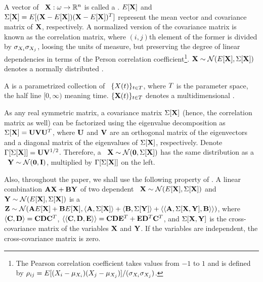 A vector of \rvs\ $\mathbf{X}: \omega \to \mathbb{R}^n$ is called a . $E[\mathbf{X}]$ and $\Sigma[\mathbf{X}] = E[(\mathbf{X} - E[\mathbf{X}])(\mathbf{X} - E[\mathbf{X}])^T]$ represent the mean vector and covariance matrix of $\mathbf{X}$, respectively. A normalized version of the covariance matrix is known as the correlation matrix, where $(i,j)$th element of the former is divided by $\sigma_{X_i} \sigma_{X_j}$, loosing the units of measure, but preserving the degree of linear dependencies in terms of the Person correlation coefficient\footnote{The Pearson correlation coefficient takes values from $-1$ to $1$ and is defined by $\rho_{ij} = E[(X_i - \mu_{X_i})(X_j - \mu_{X_j})]/(\sigma_{X_i}\sigma_{X_j})$.}. $\mathbf{X} \sim \mathcal{N}(E[\mathbf{X}], \Sigma[\mathbf{X}])$ denotes a normally distributed \mrv.

A  is a parametrized collection of \rvs\ $\{ X(t) \}_{t \in T}$, where $T$ is the parameter space, the half line $[0, \infty)$ meaning time. $\{ \mathbf{X}(t) \}_{t \in T}$ denotes a multidimensional \sp.

As any real symmetric matrix, a covariance matrix $\Sigma[\mathbf{X}]$ (hence, the correlation matrix as well) can be factorized using the eigenvalue decomposition \cite{press2007} as $\Sigma[\mathbf{X}] = \mathbf{U} \mathbf{V} \mathbf{U}^T$, where $\mathbf{U}$ and $\mathbf{V}$ are an orthogonal matrix of the eigenvectors and a diagonal matrix of the eigenvalues of $\Sigma[\mathbf{X}]$, respectively. Denote $\Gamma[\Sigma[\mathbf{X}]] = \mathbf{U} \mathbf{V}^{1/2}$. Therefore, a \mnrv\ $\mathbf{X} \sim \mathcal{N}(\mathbf{0}, \Sigma[\mathbf{X}])$ has the same distribution as a \msnrv\ $\mathbf{Y} \sim \mathcal{N}(\mathbf{0}, \mathbf{I})$, multiplied by $\Gamma[\Sigma[\mathbf{X}]]$ on the left.

Also, throughout the paper, we shall use the following property of \mnrvs. A linear combination $\mathbf{A} \mathbf{X} + \mathbf{B} \mathbf{Y}$ of two dependent \mnrvs\ $\mathbf{X} \sim \mathcal{N}(E[\mathbf{X}], \Sigma[\mathbf{X}])$ and $\mathbf{Y} \sim \mathcal{N}(E[\mathbf{X}], \Sigma[\mathbf{X}])$ is a \mnrv\ $\mathbf{Z} \sim \mathcal{N}(\mathbf{A} E[\mathbf{X}] + \mathbf{B} E[\mathbf{X}], \langle \mathbf{A}, \Sigma[\mathbf{X}] \rangle + \langle \mathbf{B}, \Sigma[\mathbf{Y}] \rangle + \langle \langle \mathbf{A}, \Sigma[\mathbf{X}, \mathbf{Y}], \mathbf{B} \rangle \rangle)$, where $\langle \mathbf{C}, \mathbf{D} \rangle = \mathbf{C} \mathbf{D} \mathbf{C}^T$, $\langle \langle \mathbf{C}, \mathbf{D}, \mathbf{E} \rangle \rangle = \mathbf{C} \mathbf{D} \mathbf{E}^T + \mathbf{E} \mathbf{D}^T \mathbf{C}^T$, and $\Sigma[\mathbf{X}, \mathbf{Y}]$ is the cross-covariance matrix of the variables $\mathbf{X}$ and $\mathbf{Y}$. If the variables are independent, the cross-covariance matrix is zero.

